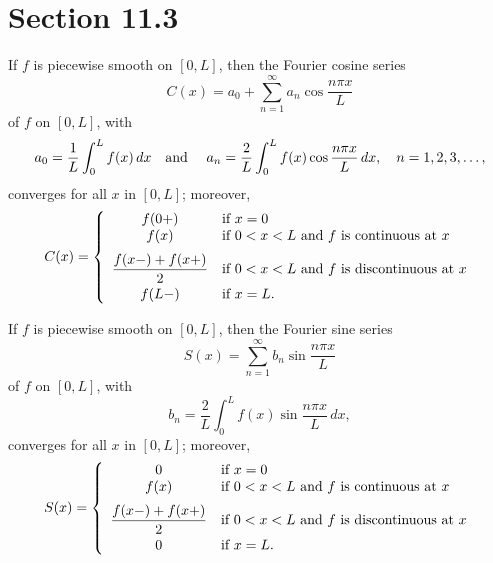 \section*{Section 11.3}
\setcounter{chapter}{11}
\setcounter{section}{3}

\setcounter{theorem}{0}
\begin{theorem}
  \label{thmtype:11.3.1} If $f$ is piecewise smooth on $[0,L]$, then the Fourier cosine series
  \[
    C(x)=a_{0}+\sum_{n=1}^{\infty}a_{n}\cos\frac{n\pi x}{L}
  \]
  of $f$ on $[0,L]$, with
  \[
    a_{0}=\frac{1}{L}\int_{0}^{L}f(x)\,dx \mbox{\quad and \quad}a_{n}=\frac{2}{L}\int_{0}^{L}f(x)\cos\frac{n\pi x}{L}\,dx,\quad n=1,2,3,\dots,
  \]
  converges for all $x$ in $[0,L]$; moreover,
  \[
    C(x)= \left\{
    \begin{array}{cl}
      f(0+)                     & \mbox{if }x=0                                     \\
      f(x)                      & \mbox{if $0<x<L$ and $f$ is continuous at $x$}    \\[2\jot]
      \displaystyle\frac{f(x-)+f(x+)}{2} & \mbox{if $0<x<L$ and $f$ is discontinuous at $x$} \\[2\jot]
      f(L-)                     & \mbox{if }x=L.
    \end{array}\right.
  \]
\end{theorem}

\setcounter{theorem}{1}
\begin{theorem}
  \label{thmtype:11.3.2} If $f$ is piecewise smooth on $[0,L]$, then the Fourier sine series
  \[
    S(x)=\sum_{n=1}^{\infty}b_{n}\sin\frac{n\pi x}{L}
  \]
  of $f$ on $[0,L]$, with
  \[
    b_{n}=\frac{2}{L}\int_{0}^{L}f(x)\sin\frac{n\pi x}{L}\,dx,
  \]
  converges for all $x$ in $[0,L]$; moreover,
  \[
    S(x)= \left\{
    \begin{array}{cl}
      0                         & \mbox{if }x=0                                     \\
      f(x)                      & \mbox{if $0<x<L$ and $f$ is continuous at $x$}    \\[2\jot]
      \displaystyle\frac{f(x-)+f(x+)}{2} & \mbox{if $0<x<L$ and $f$ is discontinuous at $x$} \\[2\jot]
      0                         & \mbox{if }x=L.
    \end{array}\right.
  \]
\end{theorem}

